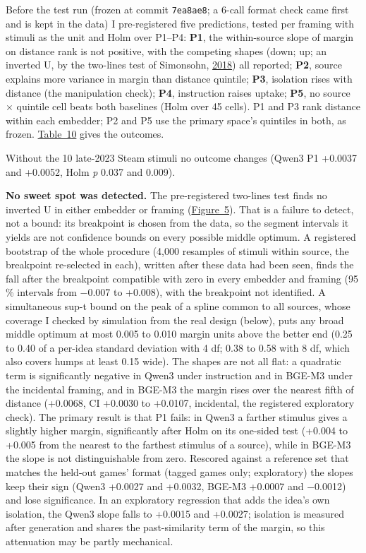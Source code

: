 \documentclass[
  10pt,
]{article}
\begin{document}
Before the test run (frozen at commit
\texttt{7ea8ae8}; a 6-call format check
came first and is kept in the data) I
pre-registered five predictions, tested
per framing with stimuli as the unit and
Holm over P1--P4: \textbf{P1}, the
within-source slope of margin on
distance rank is not positive, with the
competing shapes (down; up; an inverted
U, by the two-lines test of Simonsohn,
\hyperlink{ref-Simonsohn2018}{2018}) all
reported; \textbf{P2}, source explains
more variance in margin than distance
quintile; \textbf{P3}, isolation rises
with distance (the manipulation check);
\textbf{P4}, instruction raises uptake;
\textbf{P5}, no source × quintile cell
beats both baselines (Holm over 45
cells). P1 and P3 rank distance within
each embedder; P2 and P5 use the primary
space's quintiles in both, as frozen.
\hyperref[tab:10]{Table~10} gives the
outcomes.

Without the 10 late-2023 Steam stimuli
no outcome changes (Qwen3 P1 +0.0037 and
+0.0052, Holm \emph{p} 0.037 and 0.009).

\textbf{No sweet spot was detected.} The
pre-registered two-lines test finds no
inverted U in either embedder or framing
(\hyperref[fig:5]{Figure~5}). That is a
failure to detect, not a bound: its
breakpoint is chosen from the data, so
the segment intervals it yields are not
confidence bounds on every possible
middle optimum. A registered bootstrap
of the whole procedure (4,000 resamples
of stimuli within source, the breakpoint
re-selected in each), written after
these data had been seen, finds the fall
after the breakpoint compatible with
zero in every embedder and framing (95
\% intervals from −0.007 to +0.008),
with the breakpoint not identified. A
simultaneous sup-t bound on the peak of
a spline common to all sources, whose
coverage I checked by simulation from
the real design (below), puts any broad
middle optimum at most 0.005 to 0.010
margin units above the better end (0.25
to 0.40 of a per-idea standard deviation
with 4 df; 0.38 to 0.58 with 8 df, which
also covers humps at least 0.15 wide).
The shapes are not all flat: a quadratic
term is significantly negative in Qwen3
under instruction and in BGE-M3 under
the incidental framing, and in BGE-M3
the margin rises over the nearest fifth
of distance (+0.0068, CI +0.0030 to
+0.0107, incidental, the registered
exploratory check). The primary result
is that P1 fails: in Qwen3 a farther
stimulus gives a slightly higher margin,
significantly after Holm on its
one-sided test (+0.004 to +0.005 from
the nearest to the farthest stimulus of
a source), while in BGE-M3 the slope is
not distinguishable from zero. Rescored
against a reference set that matches the
held-out games' format (tagged games
only; exploratory) the slopes keep their
sign (Qwen3 +0.0027 and +0.0032, BGE-M3
+0.0007 and −0.0012) and lose
significance. In an exploratory
regression that adds the idea's own
isolation, the Qwen3 slope falls to
+0.0015 and +0.0027; isolation is
measured after generation and shares the
past-similarity term of the margin, so
this attenuation may be partly
mechanical.
\end{document}
